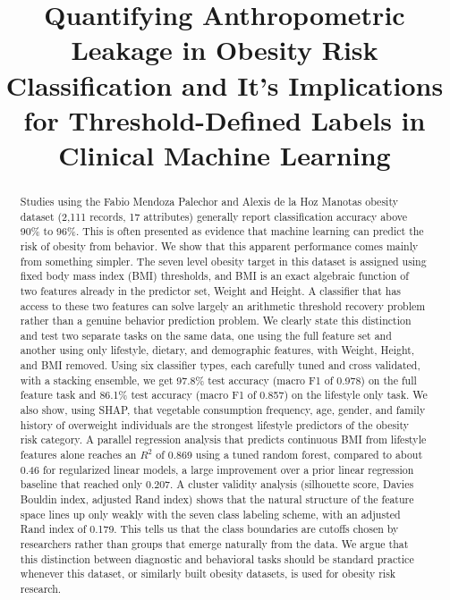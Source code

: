 \documentclass[journal]{IEEEtran}
\begin{document}
\title{Quantifying Anthropometric Leakage in Obesity Risk Classification and It's Implications for Threshold-Defined Labels in Clinical Machine Learning}

\author{\textit{
}}



\maketitle

\begin{abstract}
Studies using the Fabio Mendoza Palechor and Alexis de la Hoz Manotas obesity dataset (2{,}111 records, 17 attributes) generally report classification accuracy above 90\% to 96\%. This is often presented as evidence that machine learning can predict the risk of obesity from behavior. We show that this apparent performance comes mainly from something simpler. The seven level obesity target in this dataset is assigned using fixed body mass index (BMI) thresholds, and BMI is an exact algebraic function of two features already in the predictor set, Weight and Height. A classifier that has access to these two features can solve largely an arithmetic threshold recovery problem rather than a genuine behavior prediction problem. We clearly state this distinction and test two separate tasks on the same data, one using the full feature set and another using only lifestyle, dietary, and demographic features, with Weight, Height, and BMI removed. Using six classifier types, each carefully tuned and cross validated, with a stacking ensemble, we get 97.8\% test accuracy (macro F1 of 0.978) on the full feature task and 86.1\% test accuracy (macro F1 of 0.857) on the lifestyle only task. We also show, using SHAP, that vegetable consumption frequency, age, gender, and family history of overweight individuals are the strongest lifestyle predictors of the obesity risk category. A parallel regression analysis that predicts continuous BMI from lifestyle features alone reaches an $R^{2}$ of 0.869 using a tuned random forest, compared to about 0.46 for regularized linear models, a large improvement over a prior linear regression baseline that reached only 0.207. A cluster validity analysis (silhouette score, Davies Bouldin index, adjusted Rand index) shows that the natural structure of the feature space lines up only weakly with the seven class labeling scheme, with an adjusted Rand index of 0.179. This tells us that the class boundaries are cutoffs chosen by researchers rather than groups that emerge naturally from the data. We argue that this distinction between diagnostic and behavioral tasks should be standard practice whenever this dataset, or similarly built obesity datasets, is used for obesity risk research.
\end{abstract}
\end{document}

